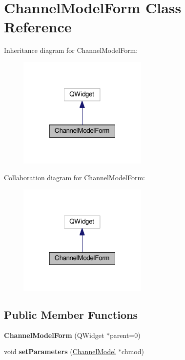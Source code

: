 \hypertarget{class_channel_model_form}{}\section{Channel\+Model\+Form Class Reference}
\label{class_channel_model_form}


Inheritance diagram for Channel\+Model\+Form\+:
\nopagebreak
\begin{figure}[H]
\begin{center}
\leavevmode
\includegraphics[width=181pt]{class_channel_model_form__inherit__graph}
\end{center}
\end{figure}


Collaboration diagram for Channel\+Model\+Form\+:
\nopagebreak
\begin{figure}[H]
\begin{center}
\leavevmode
\includegraphics[width=181pt]{class_channel_model_form__coll__graph}
\end{center}
\end{figure}
\subsection*{Public Member Functions}
\begin{DoxyCompactItemize}
\item 
{\bfseries Channel\+Model\+Form} (Q\+Widget $\ast$parent=0)\hypertarget{class_channel_model_form_aa46c9d658def4f8771c16c4c8cf46053}{}\label{class_channel_model_form_aa46c9d658def4f8771c16c4c8cf46053}

\item 
void {\bfseries set\+Parameters} (\hyperlink{class_channel_model}{Channel\+Model} $\ast$chmod)\hypertarget{class_channel_model_form_acd2695fd71d1148450792cc0fa9f0b35}{}\label{class_channel_model_form_acd2695fd71d1148450792cc0fa9f0b35}

\end{DoxyCompactItemize}


